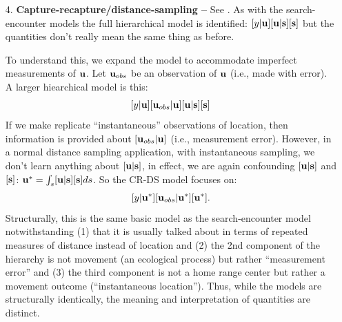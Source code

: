 \begin{itemize}
\item[4.] {\bf Capture-recapture/distance-sampling -- } See
  \citet{borchers_etal:1998}. As with the search-encounter models the
full hierarchical model is identified:
$[y|{\bf u}][{\bf u}|{\bf s}][{\bf s}]$ but the quantities don't
really mean the same thing as before.

To understand this, we expand the model to accommodate imperfect
measurements of ${\bf u}$. Let ${\bf u}_{obs}$ be an observation of
${\bf u}$ (i.e., made with error). A larger hiearchical model is this:
\[
[y|{\bf u}][{\bf u}_{obs}|{\bf u}][{\bf u}|{\bf s}][{\bf s}]
\]
If we make replicate ``instantaneous'' observations of location, then
information is provided about
 $[{\bf u}_{obs}|{\bf u}]$ (i.e., measurement error). However, in a normal
 distance sampling application, with instantaneous sampling, we don't
 learn anything about $[{\bf u}|{\bf s}]$,
in effect, we are again confounding $[{\bf u}|{\bf s}]$ and $[{\bf
  s}]$: ${\bf u}^{*} = \int_{s} [{\bf u}|{\bf s}][{\bf s}] ds$. So the CR-DS model focuses on:
\[
[y|{\bf u}^{*}][{\bf u}_{obs}|{\bf u}^{*}][{\bf u}^{*}].
\]
Structurally, this is the same basic model as the search-encounter
model notwithstanding (1) that it is usually talked about in terms of
repeated measures of distance instead of location and (2) the 2nd
component of the hierarchy is not movement (an ecological process) but
rather ``measurement error'' and (3) the third component is not a home
range center but rather a movement outcome (``instantaneous
location'').  Thus, while the models are structurally identically, the
meaning and interpretation of quantities are distinct.

\end{itemize}


